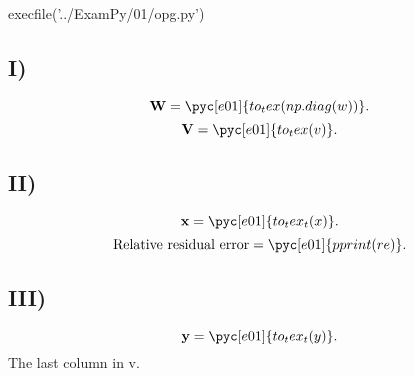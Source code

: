 \documentclass[../main.tex]{subfiles}
\begin{document}
\begin{pycode}[e01]
execfile('../ExamPy/01/opg.py')
\end{pycode}

\subsection*{I)}%
\label{sub:i}
\[
	\textbf{W}= \pyc[e01]{to_tex(np.diag(w))}
.\] 
\[
	\textbf{V}=\pyc[e01]{to_tex(v)}
.\] 
\subsection*{II)}%
\label{sub:ii}


\[
	\textbf{x} = \pyc[e01]{to_tex_t(x)}
.\] 
\[
	\textrm{Relative residual error}=\pyc[e01]{pprint(re)}
.\] 
\subsection*{III)}%
\label{sub:iii}
\[
	\textbf{y}=\pyc[e01]{to_tex_t(y)}
.\] 
The last column in v.

\inputminted{python}{../ExamPy/01/opg.py}

	
\end{document}
